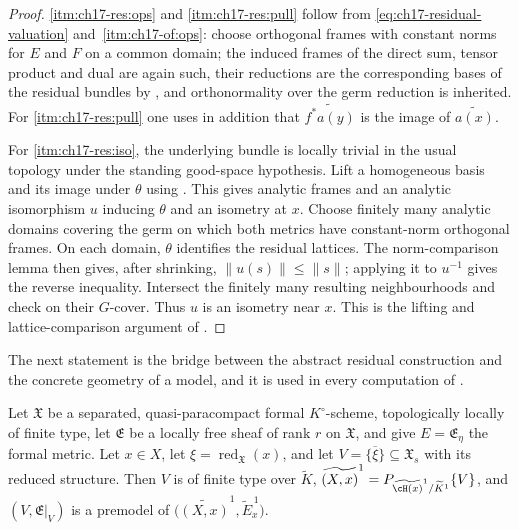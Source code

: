 \begin{proof}
\cref{itm:ch17-res:ops} and \cref{itm:ch17-res:pull} follow from
\eqref{eq:ch17-residual-valuation} and
\,\cref{itm:ch17-of:ops}: choose orthogonal
frames with constant norms for $E$ and $F$ on a common domain; the
induced frames of the direct sum, tensor product and dual are again such,
their reductions are the corresponding bases of the residual bundles by
, and orthonormality over the germ
reduction is inherited.  For \cref{itm:ch17-res:pull} one uses in addition
that $\widetilde{f^*a(y)}$ is the image of $\widetilde{a(x)}$.

For \cref{itm:ch17-res:iso}, the underlying bundle is locally trivial
in the usual topology under the standing good-space hypothesis.
Lift a homogeneous basis and its image under $\theta$ using
\cite[Lemma~17.3.2]{CLD25}.  This gives analytic frames and an analytic
isomorphism $u$ inducing $\theta$ and an isometry at $x$.
Choose finitely many analytic domains covering the germ on which both
metrics have constant-norm orthogonal frames.  On each domain,
$\theta$ identifies the residual lattices.  The norm-comparison
lemma \cite[Lemma~17.4.4]{CLD25} then gives, after shrinking,
$\|u(s)\|\le\|s\|$; applying it to $u^{-1}$ gives the reverse
inequality.  Intersect the finitely many resulting neighbourhoods and
check on their $G$-cover.  Thus $u$ is an isometry near $x$.
This is the lifting and lattice-comparison argument of
\cite[Corollary~17.4.6 and Theorem~17.4.9]{CLD25}.
\end{proof}

The next statement is the bridge between the abstract residual construction
and the concrete geometry of a model, and it is used in every computation of
.

\begin{lemma}
\label{lem:ch17-residual-formal}
Let $\mathfrak X$ be a separated, quasi-paracompact formal
$K^\circ$-scheme, topologically locally of finite type, let
$\mathfrak E$ be a locally free sheaf of rank $r$ on $\mathfrak X$,
and give $E=\mathfrak E_\eta$ the formal metric.  Let $x\in X$, let
$\xi=\operatorname{red}_{\mathfrak X}(x)$, and let
$V=\overline{\{\xi\}}\subseteq\mathfrak X_s$ with its reduced structure.
Then $V$ is of finite type over $\widetilde K$,
$\widetilde{(X,x)}^{1}=P_{\widetilde{\cH(x)}^1/\widetilde K^1}\{V\}$, and
$(V,\mathfrak E|_V)$ is a premodel of
$\bigl(\widetilde{(X,x)}^1,\widetilde E_x^{\,1}\bigr)$.
\end{lemma}

